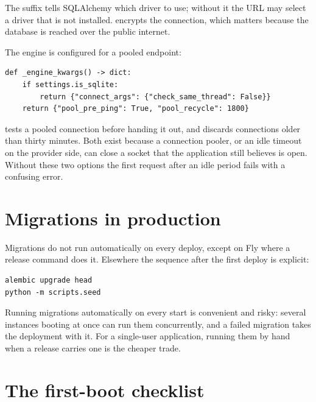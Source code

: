 The  suffix tells SQLAlchemy which driver to use; without it the
URL may select a driver that is not installed.  encrypts
the connection, which matters because the database is reached over the public
internet.

The engine is configured for a pooled endpoint:

\begin{lstlisting}[style=py]
def _engine_kwargs() -> dict:
    if settings.is_sqlite:
        return {"connect_args": {"check_same_thread": False}}
    return {"pool_pre_ping": True, "pool_recycle": 1800}
\end{lstlisting}

 tests a pooled connection before handing it out, and
 discards connections older than thirty minutes. Both exist
because a connection pooler, or an idle timeout on the provider side, can close
a socket that the application still believes is open. Without these two options
the first request after an idle period fails with a confusing error.

\section{Migrations in production}

Migrations do not run automatically on every deploy, except on Fly where a
release command does it. Elsewhere the sequence after the first deploy is
explicit:

\begin{lstlisting}[style=sh]
alembic upgrade head
python -m scripts.seed
\end{lstlisting}

Running migrations automatically on every start is convenient and risky: several
instances booting at once can run them concurrently, and a failed migration
takes the deployment with it. For a single-user application, running them by
hand when a release carries one is the cheaper trade.

\section{The first-boot checklist}

